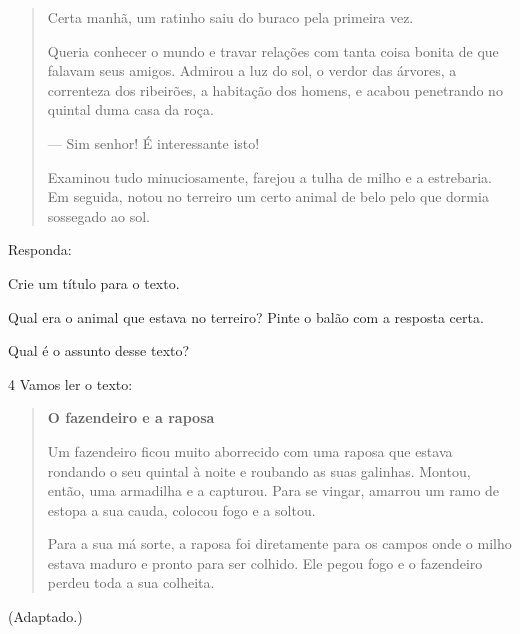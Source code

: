 \begin{quote}
Certa manhã, um ratinho saiu do buraco pela primeira vez.

Queria conhecer o mundo e travar relações com tanta coisa bonita de que
falavam seus amigos. Admirou a luz do sol, o verdor das árvores, a
correnteza dos ribeirões, a habitação dos homens, e acabou penetrando no
quintal duma casa da roça.

--- Sim senhor! É interessante isto!

Examinou tudo minuciosamente, farejou a tulha de milho e a estrebaria.
Em seguida, notou no terreiro um certo animal de belo pelo que dormia
sossegado ao sol.
\end{quote}


Responda:

\begin{escolha}
\item Crie um título para o texto.


\item Qual era o animal que estava no terreiro? Pinte o balão com a resposta certa.

\item Qual é o assunto desse texto?

\end{escolha}

\num{4} Vamos ler o texto:


\begin{quote}
\textbf{O fazendeiro e a raposa}

Um fazendeiro ficou muito aborrecido com uma raposa que estava rondando o
seu quintal à noite e roubando as suas galinhas. Montou, então, uma
armadilha e a capturou. Para se vingar, amarrou um ramo de estopa
a sua cauda, colocou fogo e a soltou.

Para a sua má sorte, a raposa foi diretamente para os campos onde o milho
estava maduro e pronto para ser colhido. Ele pegou fogo e o fazendeiro perdeu toda a sua colheita.
\end{quote}

 (Adaptado.)

